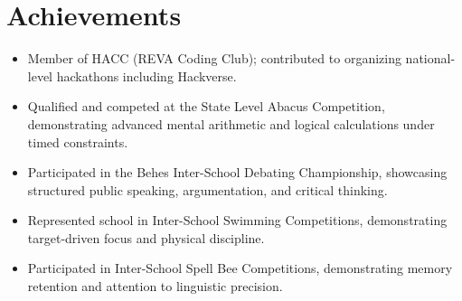 \documentclass[10pt,letterpaper]{article}
\begin{document}
\section{Achievements}
\begin{itemize}[leftmargin=0.2in, itemsep=2pt, parsep=1pt]
    \item Member of HACC (REVA Coding Club); contributed to organizing national-level hackathons including Hackverse.
    \item Qualified and competed at the State Level Abacus Competition, demonstrating advanced mental arithmetic and logical calculations under timed constraints.
    \item Participated in the Behes Inter-School Debating Championship, showcasing structured public speaking, argumentation, and critical thinking.
    \item Represented school in Inter-School Swimming Competitions, demonstrating target-driven focus and physical discipline.
    \item Participated in Inter-School Spell Bee Competitions, demonstrating memory retention and attention to linguistic precision.
\end{itemize}
\end{document}
